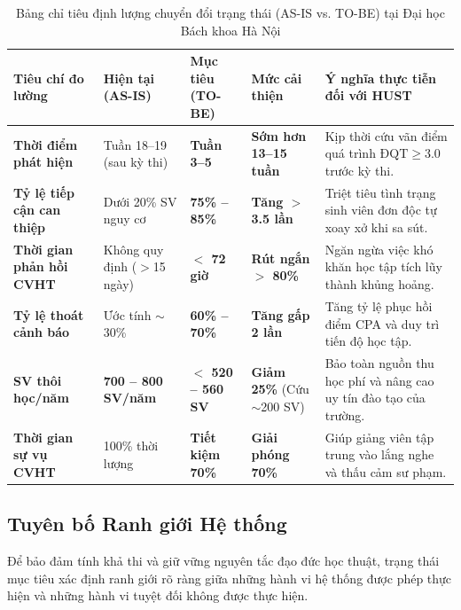\begin{table}[htbp]
\centering
\caption{Bảng chỉ tiêu định lượng chuyển đổi trạng thái (AS-IS vs. TO-BE) tại Đại học Bách khoa Hà Nội}
\label{tab:chi_tieu_dinh_luong}
\vspace{0.2cm}
\begin{tabularx}{\textwidth}{|L{3.5cm}|C{2.2cm}|C{2.4cm}|C{2.4cm}|Y|}
\hline
\textbf{Tiêu chí đo lường} & \textbf{Hiện tại (AS-IS)} & \textbf{Mục tiêu (TO-BE)} & \textbf{Mức cải thiện} & \textbf{Ý nghĩa thực tiễn đối với HUST} \\
\hline
\textbf{Thời điểm phát hiện} & Tuần 18--19 (sau kỳ thi) & \textbf{Tuần 3--5} & \textbf{Sớm hơn 13--15 tuần} & Kịp thời cứu vãn điểm quá trình $\text{ĐQT} \ge 3.0$ trước kỳ thi. \\
\hline
\textbf{Tỷ lệ tiếp cận can thiệp} & Dưới 20\% SV nguy cơ & \textbf{75\% -- 85\%} & \textbf{Tăng $>$ 3.5 lần} & Triệt tiêu tình trạng sinh viên đơn độc tự xoay xở khi sa sút. \\
\hline
\textbf{Thời gian phản hồi CVHT} & Không quy định ($>$15 ngày) & \textbf{$<$ 72 giờ} & \textbf{Rút ngắn $>$ 80\%} & Ngăn ngừa việc khó khăn học tập tích lũy thành khủng hoảng. \\
\hline
\textbf{Tỷ lệ thoát cảnh báo} & Ước tính $\sim$30\% & \textbf{60\% -- 70\%} & \textbf{Tăng gấp 2 lần} & Tăng tỷ lệ phục hồi điểm CPA và duy trì tiến độ học tập. \\
\hline
\textbf{SV thôi học/năm} & \textbf{700 -- 800 SV/năm} & \textbf{$<$ 520 -- 560 SV} & \textbf{Giảm 25\%} (Cứu $\sim$200 SV) & Bảo toàn nguồn thu học phí và nâng cao uy tín đào tạo của trường. \\
\hline
\textbf{Thời gian sự vụ CVHT} & 100\% thời lượng & \textbf{Tiết kiệm 70\%} & \textbf{Giải phóng 70\%} & Giúp giảng viên tập trung vào lắng nghe và thấu cảm sư phạm. \\
\hline
\end{tabularx}
\end{table}

\subsection{Tuyên bố Ranh giới Hệ thống}
Để bảo đảm tính khả thi và giữ vững nguyên tắc đạo đức học thuật, trạng thái mục tiêu xác định ranh giới rõ ràng giữa những hành vi hệ thống được phép thực hiện và những hành vi tuyệt đối không được thực hiện.

